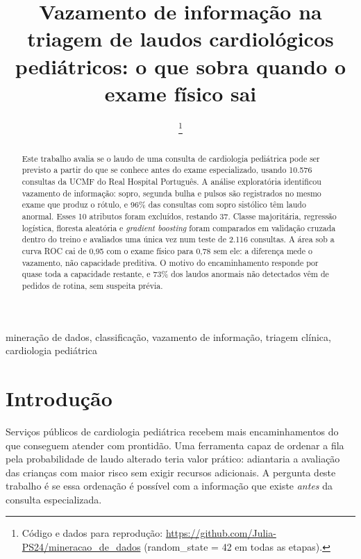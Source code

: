 \documentclass[conference]{IEEEtran}
\begin{document}
\title{Vazamento de informação na triagem de laudos cardiológicos pediátricos: o que sobra quando o exame físico sai}
\author{
\thanks{Código e dados para reprodução: \protect\url{https://github.com/Julia-PS24/mineracao_de_dados} (random\_state = 42 em todas as etapas).}}
\maketitle

\begin{abstract}
Este trabalho avalia se o laudo de uma consulta de cardiologia pediátrica pode ser previsto a partir do que se conhece antes do exame especializado, usando 10.576 consultas da UCMF do Real Hospital Português. A análise exploratória identificou vazamento de informação: sopro, segunda bulha e pulsos são registrados no mesmo exame que produz o rótulo, e 96\% das consultas com sopro sistólico têm laudo anormal. Esses 10 atributos foram excluídos, restando 37. Classe majoritária, regressão logística, floresta aleatória e \textit{gradient boosting} foram comparados em validação cruzada dentro do treino e avaliados uma única vez num teste de 2.116 consultas. A área sob a curva ROC cai de 0,95 com o exame físico para 0,78 sem ele: a diferença mede o vazamento, não capacidade preditiva. O motivo do encaminhamento responde por quase toda a capacidade restante, e 73\% dos laudos anormais não detectados vêm de pedidos de rotina, sem suspeita prévia.
\end{abstract}

\begin{IEEEkeywords}
mineração de dados, classificação, vazamento de informação, triagem clínica, cardiologia pediátrica
\end{IEEEkeywords}

\section{Introdução}
Serviços públicos de cardiologia pediátrica recebem mais encaminhamentos do que conseguem atender com prontidão. Uma ferramenta capaz de ordenar a fila pela probabilidade de laudo alterado teria valor prático: adiantaria a avaliação das crianças com maior risco sem exigir recursos adicionais. A pergunta deste trabalho é se essa ordenação é possível com a informação que existe \textit{antes} da consulta especializada.
\end{document}
